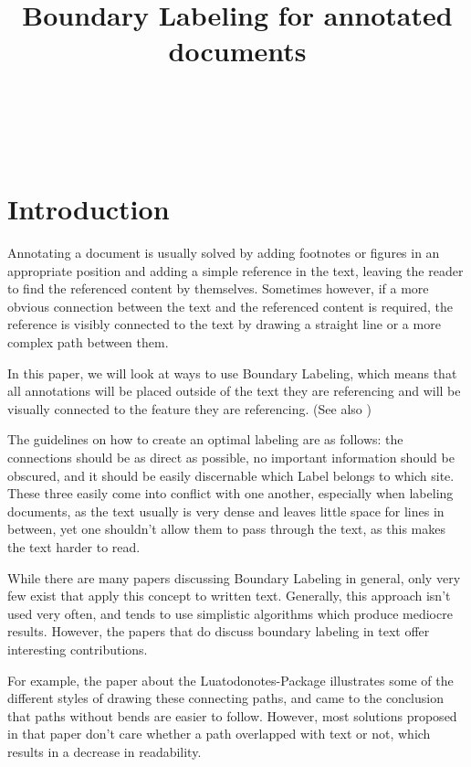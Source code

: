 \documentclass[11pt,a4paper]{article}
\title{Boundary Labeling for annotated documents}%
\author{
 \authorname{Jakob Klinger} \\
 \studentnumber{1125755} \\
 \curriculum{033 534} \\
 \email{e1125755@student.tuwien.ac.at}
}
\begin{document}
\maketitle


\section{Introduction}
Annotating a document is usually solved by adding footnotes or figures in an appropriate position and adding a simple reference in the text, leaving the reader to find the referenced content by themselves. Sometimes however, if a more obvious connection between the text and the referenced content is required, the reference is visibly connected to the text by drawing a straight line or a more complex path between them.

In this paper, we will look at ways to use Boundary Labeling, which means that all annotations will be placed outside of the text they are referencing and will be visually connected to the feature they are referencing. (See also \cite{Bekos2007}) 

The guidelines on how to create an optimal labeling are as follows: the connections should be as direct as possible, no important information should be obscured, and it should be easily discernable which Label belongs to which site. These three easily come into conflict with one another, especially when labeling documents, as the text usually is very dense and leaves little space for lines in between, yet one shouldn't allow them to pass through the text, as this makes the text harder to read. 

While there are many papers discussing Boundary Labeling in general, only very few exist that apply this concept to written text. Generally, this approach isn't used very often, and tends to use simplistic algorithms which produce mediocre results. %
However, the papers that do discuss boundary labeling in text offer interesting contributions.

For example, the paper about the Luatodonotes-Package\cite{Kindermann2014} illustrates some of the different styles of drawing these connecting paths, and came to the conclusion that paths without bends are easier to follow. %
However, most solutions proposed in that paper don't care whether a path overlapped with text or not, which results in a decrease in readability.
\end{document}
